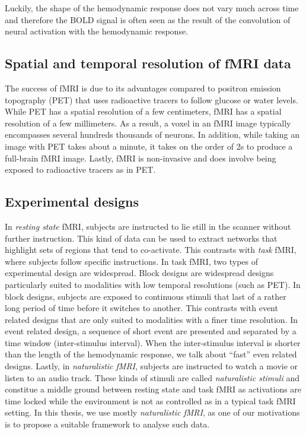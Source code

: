 Luckily, the shape of the hemodynamic response does not vary much across time
and therefore the BOLD signal is often seen as the result of the convolution of neural activation with the hemodynamic response.

\subsection{Spatial and temporal resolution of fMRI data}
The success of fMRI is due to its advantages compared to positron
emission topography (PET) that uses radioactive tracers to follow glucose or water levels.
While PET has a spatial resolution of a few
centimeters, fMRI has a spatial resolution of a few millimeters. As a result, a voxel in an fMRI image typically encompasses several hundreds thousands of neurons.
In addition, while taking an image with PET takes about a minute, it takes on the order of 2s to produce a full-brain fMRI image.
Lastly, fMRI is non-invasive and does involve being exposed to radioactive tracers as in PET.

\subsection{Experimental designs}
In \emph{resting state} fMRI, subjects are instructed to lie still in the scanner without further instruction.
This kind of data can be used to extract networks that highlight sets of regions that tend to co-activate.
This contrasts with \emph{task} fMRI, where subjects follow specific instructions.
In task fMRI, two types of experimental design are widespread.
Block designs are widespread designs particularly suited to modalities with low temporal resolutions (such as PET). In block designs, subjects are exposed to continuous stimuli that last of a rather long period of time before it switches to another.
This contrasts with event related designs that are only suited to modalities with a finer time resolution. In event related design, a sequence of short event are presented and separated by a time window (inter-stimulus interval).
When the inter-stimulus interval is shorter than the length of the hemodynamic response, we talk about ``fast'' even related designs.
Lastly, in \emph{naturalistic fMRI}, subjects are instructed to watch a movie
or listen to an audio track. These kinds of stimuli are called \emph{naturalistic stimuli} and constitue a middle ground between resting state and task fMRI as activations are time locked while the environment is not as controlled as in a typical task fMRI setting.
%
In this thesis, we use mostly \emph{naturalistic fMRI}, as one of our motivations is to propose a suitable framework to analyse such data.

